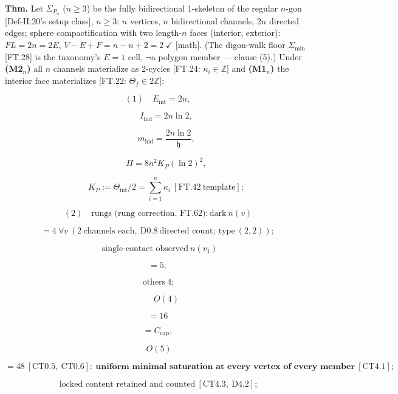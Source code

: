 \begin{theorem}\label{tag:FT-45}
\textbf{Thm.} Let $\Sigma_{P_n}$ ($n\ge3$) be the fully bidirectional 1-skeleton of the regular $n$-gon [Def-H.20's setup class], $n\ge3$: $n$ vertices, $n$ bidirectional channels, $2n$ directed edges; sphere compactification with two length-$n$ faces (interior, exterior): $FL=2n=2E$, $V-E+F=n-n+2=2\ \checkmark$ [math]. (The digon-walk floor $\Sigma_{\min}$ [FT.28] is the taxonomy's $E{=}1$ cell, $\neg$a polygon member — clause (5).) Under \textbf{(M2$_n$)} all $n$ channels materialize as 2-cycles [FT.24: $\kappa_i\in\mathbb Z$] and \textbf{(M1$_n$)} the interior face materializes [FT.22: $\Theta_f\in2\mathbb Z$]:

\[
(1)\quad E_{\mathrm{int}}=2n,
\]

\[
\qquad I_{\mathrm{hid}}=2n\ln2,
\]

\[
\qquad m_{\mathrm{hid}}=\frac{2n\ln2}{\mathfrak h},
\]

\[
\qquad \Pi=8n^2K_P(\ln2)^2,
\]

\[
\qquad K_P:=\Theta_{\mathrm{int}}/2=\textstyle\sum_{i=1}^n\kappa_i\ [\mathrm{FT.42}\ \text{template}];
\]

\[
(2)\quad\text{rungs (rung correction, FT.62)}: \text{dark}\ n(v)
\]

\[
= 4\ \forall v\ (2\ \text{channels each},\ \mathrm{D0.8}\ \text{directed count};\ \text{type}\ (2,2));
\]

\[
\ \ \text{single-contact observed}\ n(v_1)
\]

\[
= 5,
\]

\[
\ \text{others}\ 4;
\]

\[
\qquad O(4)
\]

\[
= 16
\]

\[
= C_{\mathrm{cap}},
\]

\[
\ O(5)
\]

\[
= 48\ [\mathrm{CT0.5},\ \mathrm{CT0.6}]:\ \textbf{uniform minimal saturation at every vertex of every member}\ [\mathrm{CT4.1}];
\]

\[
\ \text{locked content retained and counted}\ [\mathrm{CT4.3},\ \mathrm{D4.2}];
\]


\end{theorem}
